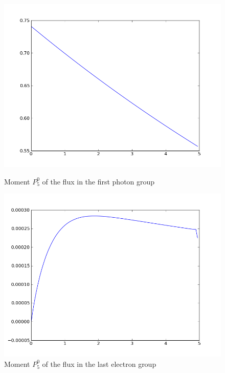 \begin{figure}[H]
\begin{minipage}[b]{0.42\linewidth}
\centering
\includegraphics[width=\linewidth]{./images/al/group_0_moment_30}
\caption{Moment $P_5^0$ of the flux in the first photon group}
\end{minipage}
\hspace{0.5cm}
\begin{minipage}[b]{0.42\linewidth}
\centering
\includegraphics[width=\linewidth]{./images/al/group_39_moment_30}
\caption{Moment $P_5^0$ of the flux in the last electron group}
\end{minipage}
\end{figure}

